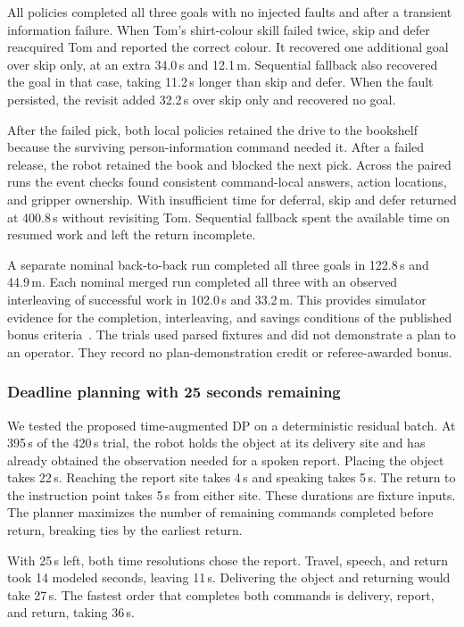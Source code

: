 \documentclass[conference]{IEEEtran}
\begin{document}
All policies completed all three goals with no injected faults and after a
transient information failure. When Tom's shirt-colour skill failed twice,
skip and defer reacquired Tom and reported the correct colour. It recovered
one additional goal over skip only, at an extra 34.0\,s and 12.1\,m.
Sequential fallback also recovered the goal in that case, taking 11.2\,s
longer than skip and defer. When the fault persisted, the revisit added
32.2\,s over skip only and recovered no goal.

After the failed pick, both local policies retained the drive to the
bookshelf because the surviving person-information command needed it.
After a failed release, the robot retained the book and blocked the next
pick. Across the paired runs the event checks found consistent command-local
answers, action locations, and gripper ownership. With insufficient time for
deferral, skip and defer returned at 400.8\,s without revisiting Tom.
Sequential fallback spent the available time on resumed work and left the
return incomplete.

A separate nominal back-to-back run completed all three goals in 122.8\,s
and 44.9\,m. Each nominal merged run completed all three with an observed
interleaving of successful work in 102.0\,s and 33.2\,m. This provides
simulator evidence for the completion, interleaving, and savings conditions
of the published bonus criteria~\cite{rulebook}. The trials used parsed
fixtures and did not demonstrate a plan to an operator. They record no
plan-demonstration credit or referee-awarded bonus.

\subsubsection{Deadline planning with 25 seconds remaining}
\label{sec:deadline-fixture}
We tested the proposed time-augmented DP on a deterministic residual batch.
At 395\,s of the 420\,s trial, the robot holds the object at its delivery
site and has already obtained the observation needed for a spoken report.
Placing the object takes 22\,s. Reaching the report site takes 4\,s and
speaking takes 5\,s. The return to the instruction point takes 5\,s from
either site. These durations are fixture inputs. The planner maximizes the
number of remaining commands completed before return, breaking ties by
the earliest return.

With 25\,s left, both time resolutions chose the report. Travel, speech,
and return took 14 modeled seconds, leaving 11\,s. Delivering the object
and returning would take 27\,s. The fastest order that completes both
commands is delivery, report, and return, taking 36\,s.
\end{document}
